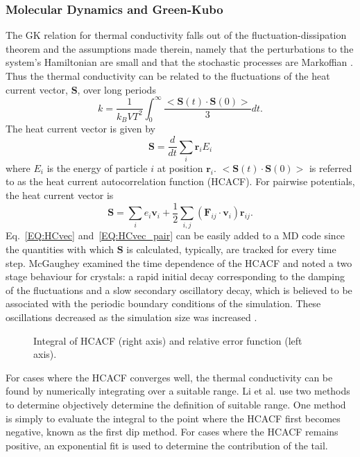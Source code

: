 \subsubsection {Molecular Dynamics and Green-Kubo}

The GK relation for thermal conductivity falls out of the fluctuation-dissipation theorem and the assumptions made therein, namely that the perturbations to the system's Hamiltonian are small and that the stochastic processes are Markoffian \cite{green:398}. Thus the thermal conductivity can be related to the fluctuations of the heat current vector, $\bm{S}$, over long periods
%
\begin{equation}\label{EQ:intHCACF}
k=\frac{1}{k_B V T^2}\int_0^{\infty}\frac{<\bm{S}(t)\cdot\bm{S}(0)>}{3}dt.
\end{equation}
%
The heat current vector is given by 
%
\begin{equation}\label{EQ:HCvec}
\bm{S}=\frac{d}{dt}\sum_i\bm{r}_iE_i
\end{equation}
%
where $E_i$ is the energy of particle $i$ at position $\bm{r}_i$. $<\bm{S}(t)\cdot\bm{S}(0)>$ is referred to as the heat current autocorrelation function (HCACF). For pairwise potentials, the heat current vector is
%
\begin{equation}\label{EQ:HCvec_pair}
\bm{S}=\sum_ie_i\bm{v}_i+\frac{1}{2}\sum_{i,j}(\bm{F}_{ij}\cdot\bm{v}_{i})\bm{r}_{ij}.
\end{equation}
%
Eq.~\ref{EQ:HCvec} and~\ref{EQ:HCvec_pair} can be easily added to a MD code since the quantities with which $\bm{S}$ is calculated, typically, are tracked for every time step. McGaughey examined the time dependence of the HCACF and noted a two stage behaviour for crystals: a rapid initial decay corresponding to the damping of the fluctuations and a slow secondary oscillatory decay, which is believed to be associated with the periodic boundary conditions of the simulation. These oscillations decreased as the simulation size was increased \cite{mcgaugheythesis}.
%
\begin{figure}
\begin{center}
\renewcommand{\figure}{Fig.}
\caption{Integral of HCACF (right axis) and relative error function (left axis).}
\label{FIG:GK_bulk}
\end{center}
\end{figure}
%
For cases where the HCACF converges well, the thermal conductivity can be found by numerically integrating over a suitable range. Li et al. \cite{Li1998139} use two methods to determine objectively determine the definition of suitable range. One method is simply to evaluate the integral to the point where the HCACF first becomes negative, known as the first dip method. For cases where the HCACF remains positive, an exponential fit is used to determine the contribution of the tail.

